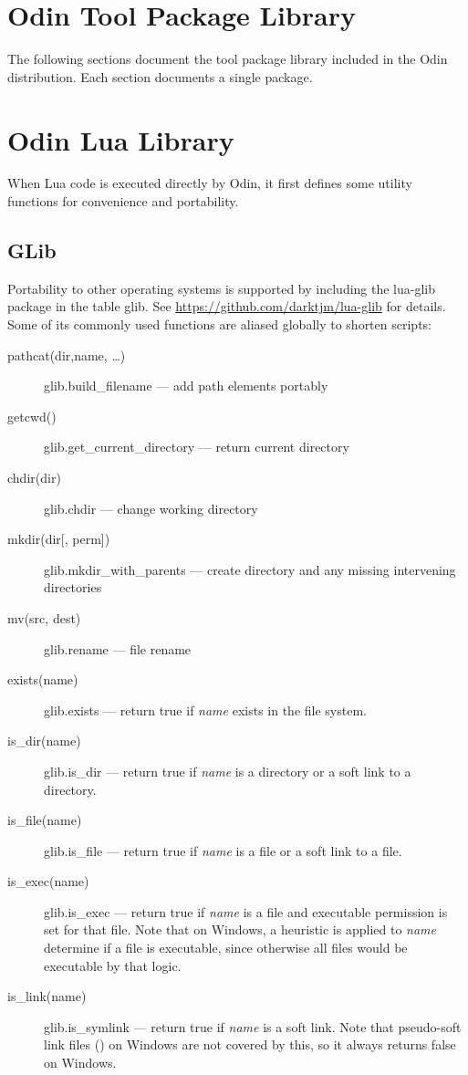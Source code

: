 \chapter{Odin Tool Package Library}

The following sections document the tool package library included in
the Odin distribution.  Each section documents a single package.



\chapter{\label{ch:lualib}Odin Lua Library}

When Lua code is executed directly by Odin, it first defines some
utility functions for convenience and portability.

\section{GLib}

Portability to other operating systems is supported by including the
lua-glib package in the table {\ex glib}.  See
\url{https://github.com/darktjm/lua-glib} for details.  Some of its
commonly used functions are aliased globally to shorten scripts: 

\begin{description}
\item[pathcat(dir,name, {\ldots})] {\ex glib.build\_filename} --- add path
elements portably
\item[getcwd()] {\ex glib.get\_current\_directory} --- return current directory
\item[chdir(dir)] {\ex glib.chdir} --- change working directory
\item[mkdir(dir{[}, perm{]})] {\ex glib.mkdir\_with\_parents} --- create
directory and any missing intervening directories
\item[mv(src, dest)] {\ex glib.rename} --- file rename
\item[exists(name)] {\ex glib.exists} --- return true if \emph{name} exists
in the file system.
\item[is\_dir(name)] {\ex glib.is\_dir} --- return true if \emph{name} is a
directory or a soft link to a directory.
\item[is\_file(name)] {\ex glib.is\_file} --- return true if \emph{name} is a
file or a soft link to a file.
\item[is\_exec(name)] {\ex glib.is\_exec} --- return true if \emph{name} is a
file and executable permission is set for that file.  Note that on Windows,
a heuristic is applied to \emph{name} determine if a file is executable,
since otherwise all files would be executable by that logic.
\item[is\_link(name)] {\ex glib.is\_symlink} --- return true if \emph{name} is
a soft link.  Note that pseudo-soft link files () on Windows are
not covered by this, so it always returns false on Windows.
\end{description}

